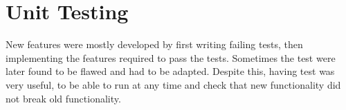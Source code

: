 \section{Unit Testing}
New features were mostly developed by first writing failing tests,
then implementing the features required to pass the tests.
Sometimes the test were later found to be flawed and had to be adapted.
Despite this, having test was very useful, to be able to run at any time and check that new functionality did not break old functionality.
